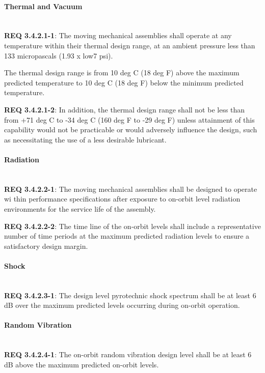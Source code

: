 \documentclass[12pt]{article}
\begin{document}
\paragraph{Thermal and Vacuum} \mbox{} \\ %
\noindent \textbf{REQ 3.4.2.1-1}: The moving mechanical assemblies shall operate at any temperature within their thermal design range, at an ambient pressure less than 133 micropascals (1.93 x low7 psi). 

The thermal design range is from 10 deg C (18 deg F) above the maximum predicted temperature to 10 deg C (18 deg F) below the minimum predicted temperature.

\noindent \textbf{REQ 3.4.2.1-2}: In addition, the thermal design range shall not be less than from +71 deg C to -34 deg C (160 deg F to -29 deg F) unless attainment of this capability would not be practicable or would adversely influence the design, such as necessitating the use of a less desirable lubricant.


\paragraph{Radiation} \mbox{} \\ %
\noindent \textbf{REQ 3.4.2.2-1}: The moving mechanical assemblies shall be designed to operate wi thin performance specifications after exposure to on-orbit level radiation environments for the service life of the assembly. 

\noindent \textbf{REQ 3.4.2.2-2}: The time line of the on-orbit levels shall include a representative number of time periods at the maximum predicted radiation levels to ensure a satisfactory design margin.


\paragraph{Shock} \mbox{} \\ %
\noindent \textbf{REQ 3.4.2.3-1}: The design level pyrotechnic shock spectrum shall be at least 6 dB over the maximum predicted levels occurring during on-orbit operation.


\paragraph{Random Vibration} \mbox{} \\ %
\noindent \textbf{REQ 3.4.2.4-1}: The on-orbit random vibration design level shall be at least 6 dB above the maximum predicted on-orbit levels.
\end{document}
